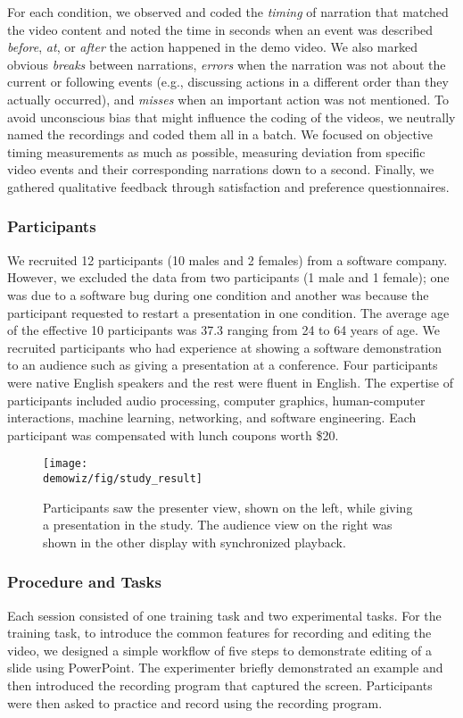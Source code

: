 For each condition, we observed and coded the \textit{timing} of narration that matched the video content and noted the time in seconds when an event was described \textit{before}, \textit{at}, or \textit{after} the action happened in the demo video. We also marked obvious \textit{breaks} between narrations, \textit{errors} when the narration was not about the current or following events (e.g., discussing actions in a different order than they actually occurred), and \textit{misses} when an important action was not mentioned. To avoid unconscious bias that might influence the coding of the videos, we neutrally named the recordings and coded them all in a batch. We focused on objective timing measurements as much as possible, measuring deviation from specific video events and their corresponding narrations down to a second. Finally, we gathered qualitative feedback through satisfaction and preference questionnaires.

\subsubsection{Participants}
We recruited 12 participants (10 males and 2 females) from a software company. However, we excluded the data from two participants (1 male and 1 female); one was due to a software bug during one condition and another was because the participant requested to restart a presentation in one condition. The average age of the effective 10 participants was 37.3 ranging from 24 to 64 years of age. We recruited participants who had experience at showing a software demonstration to an audience such as giving a presentation at a conference. Four participants were native English speakers and the rest were fluent in English. The expertise of participants included audio processing, computer graphics, human-computer interactions, machine learning, networking, and software engineering. Each participant was compensated with lunch coupons worth \$20.

\begin{figure}[t!]
  \centering
  \texttt{[image: \\demowiz/fig/study\_result]}
  \caption{Participants saw the presenter view, shown on the left, while giving a presentation in the study. The audience view on the right was shown in the other display with synchronized playback.}
  \label{fig:demowiz_results_two_views}
\end{figure}

\subsubsection{Procedure and Tasks} Each session consisted of one training task and two experimental tasks. For the training task, to introduce the common features for recording and editing the video, we designed a simple workflow of five steps to demonstrate editing of a slide using PowerPoint. The experimenter briefly demonstrated an example and then introduced the recording program that captured the screen. Participants were then asked to practice and record using the recording program.

